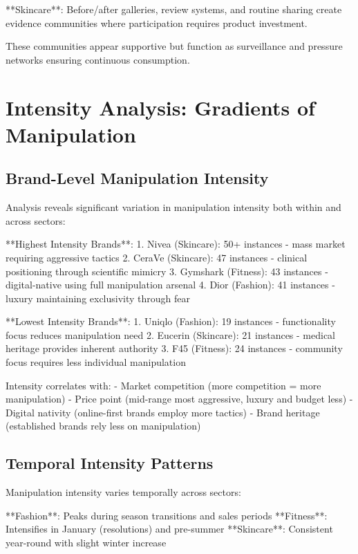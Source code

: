 **Skincare**: Before/after galleries, review systems, and routine sharing create evidence communities where participation requires product investment.

These communities appear supportive but function as surveillance and pressure networks ensuring continuous consumption.

\section{Intensity Analysis: Gradients of Manipulation}
\label{sec:intensity}

\subsection{Brand-Level Manipulation Intensity}

Analysis reveals significant variation in manipulation intensity both within and across sectors:

**Highest Intensity Brands**:
1. Nivea (Skincare): 50+ instances - mass market requiring aggressive tactics
2. CeraVe (Skincare): 47 instances - clinical positioning through scientific mimicry
3. Gymshark (Fitness): 43 instances - digital-native using full manipulation arsenal
4. Dior (Fashion): 41 instances - luxury maintaining exclusivity through fear

**Lowest Intensity Brands**:
1. Uniqlo (Fashion): 19 instances - functionality focus reduces manipulation need
2. Eucerin (Skincare): 21 instances - medical heritage provides inherent authority
3. F45 (Fitness): 24 instances - community focus requires less individual manipulation

Intensity correlates with:
- Market competition (more competition = more manipulation)
- Price point (mid-range most aggressive, luxury and budget less)
- Digital nativity (online-first brands employ more tactics)
- Brand heritage (established brands rely less on manipulation)

\subsection{Temporal Intensity Patterns}

Manipulation intensity varies temporally across sectors:

**Fashion**: Peaks during season transitions and sales periods
**Fitness**: Intensifies in January (resolutions) and pre-summer
**Skincare**: Consistent year-round with slight winter increase

